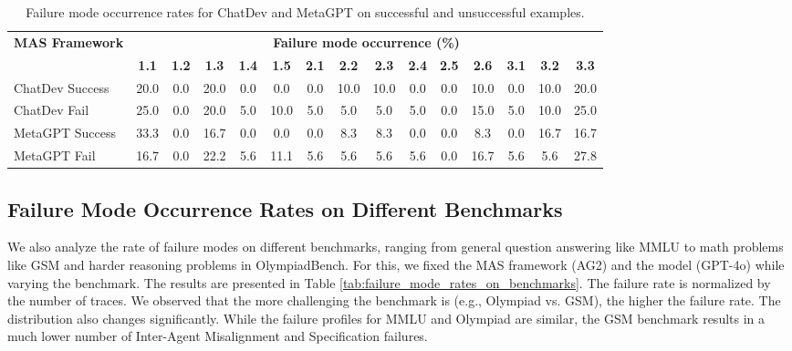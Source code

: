 \begin{table}[ht!]
    \small
    \renewcommand{\arraystretch}{1.3}
    \setlength{\tabcolsep}{3.5pt}
    \centering
    \caption{Failure mode occurrence rates for ChatDev and MetaGPT on successful and unsuccessful examples.}
    \label{tab:per-failure-mode-outcomes}
    \begin{tabular}{p{3.0cm} *{14}{c}}
        \toprule
        \textbf{MAS Framework} & \multicolumn{14}{c}{\textbf{Failure mode occurrence (\%)}} \\
        \cmidrule(lr){2-15}
         & \textbf{1.1} & \textbf{1.2} & \textbf{1.3} & \textbf{1.4} & \textbf{1.5} & \textbf{2.1} & \textbf{2.2} & \textbf{2.3} & \textbf{2.4} & \textbf{2.5} & \textbf{2.6} & \textbf{3.1} & \textbf{3.2} & \textbf{3.3} \\
        \midrule
        ChatDev Success & 20.0 & 0.0 & 20.0 & 0.0 & 0.0 & 0.0 & 10.0 & 10.0 & 0.0 & 0.0 & 10.0 & 0.0 & 10.0 & 20.0 \\
        \hline
        ChatDev Fail    & 25.0 & 0.0 & 20.0 & 5.0 & 10.0 & 5.0 & 5.0  & 5.0  & 5.0 & 0.0 & 15.0 & 5.0 & 10.0 & 25.0 \\
        \hline
        MetaGPT Success & 33.3 & 0.0 & 16.7 & 0.0 & 0.0 & 0.0 & 8.3  & 8.3  & 0.0 & 0.0 & 8.3  & 0.0 & 16.7 & 16.7 \\
        \hline
        MetaGPT Fail    & 16.7 & 0.0 & 22.2 & 5.6 & 11.1 & 5.6 & 5.6  & 5.6  & 5.6 & 0.0 & 16.7 & 5.6 & 5.6  & 27.8 \\
        \hline
    \end{tabular}
        \label{tab:failure_mode_occurrence_on_successful_traces}

\end{table}

\subsection{Failure Mode Occurrence Rates on Different Benchmarks}

We also analyze the rate of failure modes on different benchmarks, ranging from general question answering like MMLU to math problems like GSM and harder reasoning problems in OlympiadBench. For this, we fixed the MAS framework (AG2) and the model (GPT-4o) while varying the benchmark. The results are presented in Table \ref{tab:failure_mode_rates_on_benchmarks}. The failure rate is normalized by the number of traces.
We observed that the more challenging the benchmark is (e.g., Olympiad vs. GSM), the higher the failure rate. The distribution also changes significantly. While the failure profiles for MMLU and Olympiad are similar, the GSM benchmark results in a much lower number of Inter-Agent Misalignment and Specification failures.

